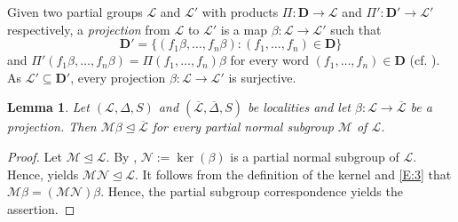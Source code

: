 \documentclass[reqno,11pt]{amsart}
\numberwithin{equation}{section}
\newtheorem{lemma}[theorem]{Lemma}
\theoremstyle{definition}
\renewcommand{\L}{\mathcal{L}}
\newcommand{\M}{\mathcal{M}}
\newcommand{\N}{\mathcal{N}}
\newcommand{\D}{\mathbf{D}}
\newcommand{\ov}{\overline}
\begin{document}
Given two partial groups $\L$ and $\L'$ with products $\Pi\colon\D\rightarrow\L$ and $\Pi'\colon \D'\rightarrow\L'$ respectively, a \emph{projection} from $\L$ to $\L'$ is a map $\beta\colon \L\rightarrow \L'$ such that
\[\D'=\{(f_1\beta,\dots,f_n\beta)\colon (f_1,\dots,f_n)\in\D\}\]
and $\Pi'(f_1\beta,\dots,f_n\beta)=\Pi(f_1,\dots,f_n)\beta$ for every word $(f_1,\dots,f_n)\in\D$ (cf. \cite[Definition~4.4]{Chermak:2015}). As $\L'\subseteq\D'$, every  projection $\beta\colon\L\rightarrow\L'$ is surjective.

\begin{lemma}\label{L:PartialNormalProjection}
Let $(\L,\Delta,S)$ and $(\ov{\L},\ov{\Delta},S)$ be localities and let $\beta\colon \L\rightarrow \ov{\L}$ be a projection. Then $\M\beta\unlhd\ov{\L}$ for every partial normal subgroup $\M$ of $\L$.
\end{lemma}

\begin{proof}
Let $\M\unlhd\L$. By \cite[Lemma~1.14]{Chermak:2015}, $\N:=\ker(\beta)$ is a partial normal subgroup of $\L$. Hence, \cite[Theorem~1]{Henke:2015a} yields  $\M\N\unlhd\L$. It follows from the definition of the kernel and \eqref{E:3} that $\M\beta=(\M\N)\beta$. Hence, the partial subgroup correspondence \cite[Theorem~4.7]{Chermak:2015} yields the assertion.
\end{proof}
\end{document}
